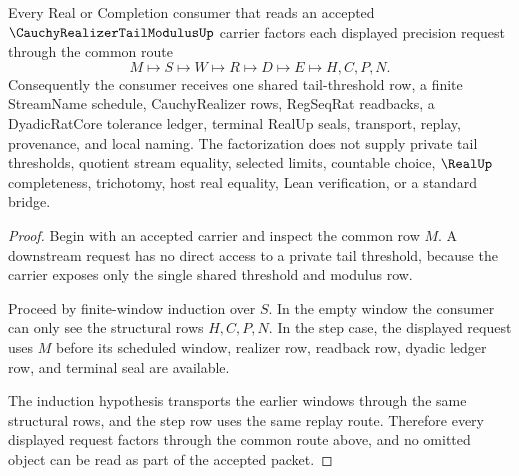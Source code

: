 \begin{theorem}
\label{thm:cauchy-realizer-tail-modulus-shared-tail-exactness}
Every Real or Completion consumer that reads an accepted $\CauchyRealizerTailModulusUp$ carrier factors each displayed precision request through the common route
$$
M \longmapsto S \longmapsto W \longmapsto R \longmapsto D \longmapsto E \longmapsto H,C,P,N .
$$
Consequently the consumer receives one shared tail-threshold row, a finite StreamName schedule, CauchyRealizer rows, RegSeqRat readbacks, a DyadicRatCore tolerance ledger, terminal RealUp seals, transport, replay, provenance, and local naming. The factorization does not supply private tail thresholds, quotient stream equality, selected limits, countable choice, $\RealUp$ completeness, trichotomy, host real equality, Lean verification, or a standard bridge.
\end{theorem}
\begin{proof}
Begin with an accepted carrier and inspect the common row $M$. A downstream request has no direct access to a private tail threshold, because the carrier exposes only the single shared threshold and modulus row.

Proceed by finite-window induction over $S$. In the empty window the consumer can only see the structural rows $H,C,P,N$. In the step case, the displayed request uses $M$ before its scheduled window, realizer row, readback row, dyadic ledger row, and terminal seal are available.

The induction hypothesis transports the earlier windows through the same structural rows, and the step row uses the same replay route. Therefore every displayed request factors through the common route above, and no omitted object can be read as part of the accepted packet.
\end{proof}

